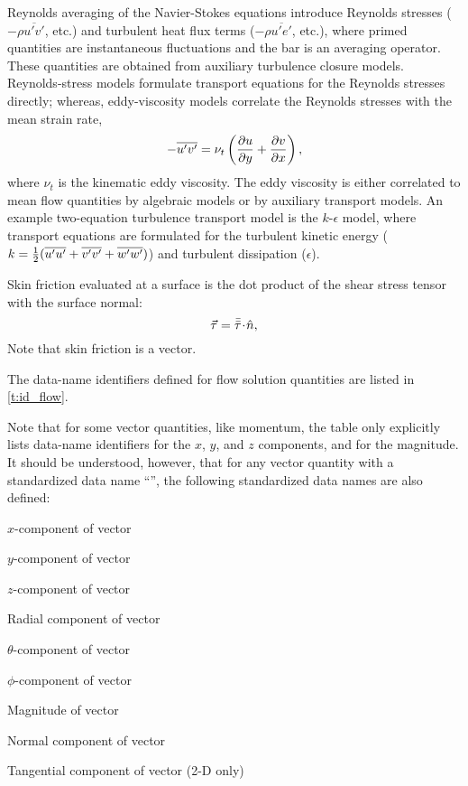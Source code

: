 Reynolds averaging of the Navier-Stokes equations introduce Reynolds
stresses ($- \rho \overline{u' v'}$, etc.) and turbulent heat flux terms
($- \rho \overline{u' e'}$, etc.), where primed quantities are
instantaneous fluctuations and the bar is an averaging operator.
These quantities are obtained from auxiliary turbulence closure models.
Reynolds-stress models formulate transport equations for the Reynolds
stresses directly; whereas, eddy-viscosity models correlate the Reynolds
stresses with the mean strain rate,
$$
 - \overline{u' v'} = \nu_t \left( {\partial u \over \partial y} + {\partial v \over \partial x} \right),
$$
where $\nu_t$ is the kinematic eddy viscosity.
The eddy viscosity is either correlated to mean flow quantities by
algebraic models or by auxiliary transport models.
An example two-equation turbulence transport model is the $k$-$\epsilon$
model, where transport equations are formulated for the turbulent kinetic
energy ($k = {1\over2}(\overline{u'u'} + \overline{v'v'} + \overline{w'w'})$)
and turbulent dissipation ($\epsilon$).

Skin friction evaluated at a surface is the dot product of the shear
stress tensor with the surface normal:
$$
 {\vec{\tau}} = \bar{\bar{\tau}} \!\cdot\! {\hat{n}},
$$
Note that skin friction is a vector.

The data-name identifiers defined for flow solution quantities are listed
in \autoref{t:id_flow}.

Note that for some vector quantities, like momentum, the table only
explicitly lists data-name identifiers for the $x$, $y$, and $z$
components, and for the magnitude.
It should be understood, however, that for any vector quantity with a
standardized data name ``'', the following standardized data
names are also defined:

\begin{Ventryic}{}
   \item [\fort{VectorX}]
         $x$-component of vector
   \item [\fort{VectorY}]
         $y$-component of vector
   \item [\fort{VectorZ}]
         $z$-component of vector
   \item [\fort{VectorR}]
         Radial component of vector
   \item [\fort{VectorTheta}]
         $\theta$-component of vector
   \item [\fort{VectorPhi}]
         $\phi$-component of vector
   \item [\fort{VectorMagnitude}]
         Magnitude of vector
   \item [\fort{VectorNormal}]
         Normal component of vector
   \item [\fort{VectorTangential}]
         Tangential component of vector (2-D only)
\end{Ventryic}

